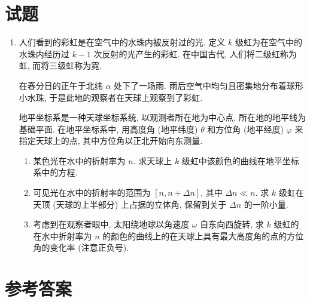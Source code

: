 \documentclass{article}
\begin{document}
\section*{试题}

\begin{enumerate}

\item
人们看到的彩虹是在空气中的水珠内被反射过的光.
定义 $k$ 级虹为在空气中的水珠内经历过 $k-1$ 次反射的光产生的彩虹.
在中国古代, 人们将二级虹称为虹, 而将三级虹称为霓.

在春分日的正午于北纬 $\alpha$ 处下了一场雨.
雨后空气中均匀且密集地分布着球形小水珠, 于是此地的观察者在天球上观察到了彩虹.

地平坐标系是一种天球坐标系统, 以观测者所在地为中心点, 所在地的地平线为基础平面.
在地平坐标系中, 用高度角 (地平纬度) $\theta$ 和方位角 (地平经度) $\varphi$ 来指定天球上的点,
其中方位角以正北开始向东测量.

\begin{enumerate}

	\item
	某色光在水中的折射率为 $n$.
	求天球上 $k$ 级虹中该颜色的曲线在地平坐标系中的方程.

	\item
	可见光在水中的折射率的范围为 $\left[n,n+\Delta n\right]$, 其中 $\Delta n\ll n$.
	求 $k$ 级虹在天顶 (天球的上半部分) 上占据的立体角, 保留到关于 $\Delta n$ 的一阶小量.

	\item
	考虑到在观察者眼中, 太阳绕地球以角速度 $\omega$ 自东向西旋转,
	求 $k$ 级虹的在水中折射率为 $n$ 的颜色的曲线上的在天球上具有最大高度角的点的方位角的变化率 (注意正负号).
\end{enumerate}

\end{enumerate}

\newpage
\section*{参考答案}
\end{document}
